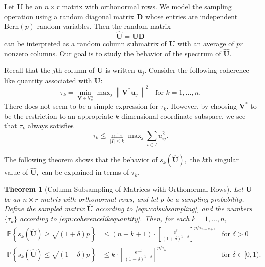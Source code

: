 \documentclass[11pt,letterpaper,twoside,reqno,nosumlimits]{amsart}
\renewcommand{\star}{*}
\newcommand{\mat}[1]{\ensuremath{\bm{#1}}} %
\renewcommand{\vec}[1]{\ensuremath{\bm{#1}}}
\newcommand{\e}{\ensuremath{\mathrm{e}}}
\newcommand{\Prob}[1]{\ensuremath{\mathbb{P}\left\{#1\right\}}}
\newcommand{\randcon}{\ensuremath{\Psi}}
\newcommand{\s}{s} %
\newcommand{\norm}[1]{\ensuremath{\left\|#1\right\|}}
\newcommand{\Isom}[2]{\ensuremath{\mathbb{V}_{#1}^{#2}}}
\newtheorem{thm}{Theorem}
\theoremstyle{remark}
\numberwithin{equation}{section}
\numberwithin{thm}{section}
\numberwithin{prop}{section}
\numberwithin{defn}{section}
\numberwithin{remark}{section}
\begin{document}
Let $\mat{U}$ be an $n \times r$ matrix with orthonormal rows. We model the sampling operation using a random diagonal matrix $\mat{D}$ whose entries are independent $\text{Bern}(p)$ random variables. Then the random matrix
\begin{equation}
\widehat{\mat{U}} = \mat{U}\mat{D}
\label{eqn:colsubsampling}
\end{equation}
can be interpreted as a random column submatrix of $\mat{U}$ with an average of $p r$ nonzero columns. Our goal is to study the behavior of the spectrum of $\widehat{\mat{U}}.$

Recall that the $j$th column of $\mat{U}$ is written $\vec{u}_j.$ Consider the following coherence-like quantity associated with $\mat{U}:$
\begin{equation}
 \tau_k  =  \min_{\mat{V} \in \Isom{k}{n}} \max\nolimits_j \norm{\mat{V}^\star \vec{u}_j}^2 \quad \text{for } k=1,\ldots,n. 
 \label{eqn:coherencelikequantity}
\end{equation}
There does not seem to be a simple expression for $\tau_k.$ However, by choosing $\mat{V}^\star$ to be the restriction to an appropriate $k$-dimensional coordinate subspace, we see that $\tau_k$ always satisfies
\[
 \tau_k \leq \min_{|I|\leq k} \max\nolimits_j \sum_{i \in I} u_{ij}^2. 
\]

The following theorem shows that the behavior of $\s_k(\widehat{\mat{U}}),$ the $k$th singular value of $\widehat{\mat{U}},$ can be explained in terms of $\tau_k.$
\begin{thm}[Column Subsampling of Matrices with Orthonormal Rows]
\label{thm:colsampling}
Let $\mat{U}$ be an $n \times r$ matrix with orthonormal rows, and let $p$ be a sampling probability. Define the sampled matrix $\widehat{\mat{U}}$ according to \eqref{eqn:colsubsampling}, and the numbers $\{\tau_k\}$ according to \eqref{eqn:coherencelikequantity}.
Then, for each $k=1,\ldots,n,$
\begin{align*}
\Prob{\s_k(\widehat{\mat{U}}) \geq \sqrt{(1 + \delta) p}} & \leq (n-k+1) \cdot \left[ \frac{\e^\delta}{(1+\delta)^{1+\delta}} \right]^{p/\tau_{n-k+1}} & \text{for $\delta > 0$} \\
\Prob{\s_k(\widehat{\mat{U}}) \leq \sqrt{(1- \delta)p} } & \leq k \cdot \left[ \frac{\e^{-\delta}}{(1-\delta)^{1-\delta}} \right]^{p/\tau_k } & \text{for $\delta \in [0,1).$} 
\end{align*}

\end{thm}
\end{document}
